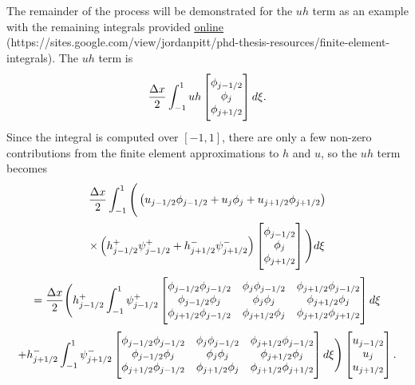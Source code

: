 The remainder of the process will be demonstrated for the $uh$ term as an example with the remaining integrals provided \href{https://sites.google.com/view/jordanpitt/phd-thesis-resources/finite-element-integrals}{\color{blue}\underline{online}} (https://sites.google.com/view/jordanpitt/phd-thesis-resources/finite-element-integrals).
The $uh$ term is 
\begin{equation*}
\frac{\Delta x}{2}\int_{-1 }^{1} uh \begin{bmatrix} \TM
\phi_{j-1/2}\\\phi_j \\\phi_{j+1/2} \BM
\end{bmatrix} d\xi.
\end{equation*}
Since the integral is computed over $\left[-1,1\right]$, there are only a few non-zero contributions from the finite element approximations to $h$ and $u$, so the $uh$ term becomes
\begin{multline*}
\frac{\Delta x}{2}\int_{-1 }^{1}  \Bigg( \left(u_{j-1/2}\phi_{j-1/2} + u_{j}\phi_{j} + u_{j+1/2}\phi_{j+1/2}\right) \\ \times\left(h^+_{j-1/2}\psi^+_{j-1/2}  + h^-_{j+1/2}\psi^-_{j+1/2}\right) \begin{bmatrix} \TM
\phi_{j-1/2}\\\phi_j \\\phi_{j+1/2} \BM
\end{bmatrix} \Bigg) d\xi\\
=\frac{\Delta x}{2}\Bigg( h^+_{j-1/2} \int_{-1 }^{1} \psi^+_{j-1/2}  \begin{bmatrix} \TM
\phi_{j-1/2} \phi_{j-1/2} & \phi_{j}  \phi_{j-1/2}  & \phi_{j+1/2} \phi_{j-1/2}\\\phi_{j-1/2} \phi_{j} & \phi_{j} \phi_{j} &  \phi_{j + 1/2} \phi_{j}\\\phi_{j+1/2} \phi_{j-1/2} &  \phi_{j+1/2} \phi_{j} & \phi_{j+1/2} \phi_{j+1/2} \BM
\end{bmatrix} d\xi  \\ +  h^-_{j+1/2}\int_{-1 }^{1} \psi^-_{j+1/2} \begin{bmatrix} \TM
\phi_{j-1/2} \phi_{j-1/2} & \phi_{j}  \phi_{j-1/2}  & \phi_{j+1/2} \phi_{j-1/2}\\\phi_{j-1/2} \phi_{j} & \phi_{j} \phi_{j} &  \phi_{j + 1/2} \phi_{j}\\\phi_{j+1/2} \phi_{j-1/2} &  \phi_{j+1/2} \phi_{j} & \phi_{j+1/2} \phi_{j+1/2} \BM
\end{bmatrix} d\xi \Bigg)  \begin{bmatrix} \TM
u_{j-1/2}\\u_j \\u _{j+1/2} \BM
\end{bmatrix}.
\end{multline*}

